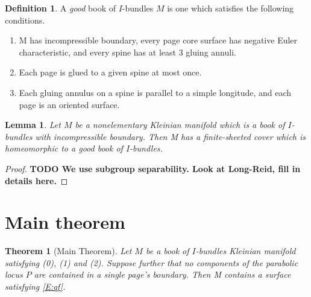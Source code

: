\documentclass[12pt]{amsart}
\newtheorem{thm}[theorem]{Theorem}
\newtheorem{lemma}[theorem]{Lemma}
\theoremstyle{definition}
\newtheorem{defn}[theorem]{Definition}
\theoremstyle{remark}
\begin{document}
\begin{defn}

A \emph{good} book of $I$-bundles $M$ is one which satisfies the following
conditions.

%

\begin{enumerate}

\item M has incompressible boundary, every page core surface has negative Euler
characteristic, and every spine has at least 3 gluing annuli. \label{I:boib-0}


\item Each page is glued to a given spine at most once. \label{I:boib-1}

\item Each gluing annulus on a spine is parallel to a simple longitude, and
each page is an oriented surface. \label{I:boib-2}

\end{enumerate}

\end{defn}

\begin{lemma}

Let $M$ be a nonelementary Kleinian manifold which is a book of $I$-bundles
with incompressible boundary. Then M has a finite-sheeted cover which is
homeomorphic to a good book of $I$-bundles.

\end{lemma}

\begin{proof}

{\bf TODO We use subgroup separability. Look at Long-Reid, fill in details
here.}

\end{proof}

\section{Main theorem}

\begin{thm}[Main Theorem]

Let $M$ be a book of $I$-bundles Kleinian manifold satisfying (0), (1) and (2).
Suppose further that no components of the parabolic locus $P$ are contained in
a single page's boundary. Then M contains a surface satisfying \eqref{E:qf}.

\end{thm}
\end{document}
